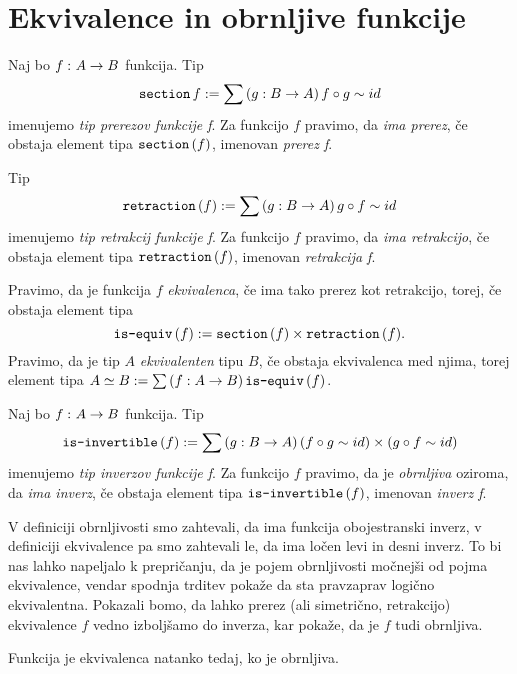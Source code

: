 \section{Ekvivalence in obrnljive funkcije}

\begin{definicija}
  Naj bo \(f \,\colon A \to B\) funkcija. Tip
  \[\textnormal{\texttt{section}}\, f := \sum \left( g : B \to A \right) f \circ g \sim id\]
  imenujemo \emph{tip prerezov funkcije f}. Za funkcijo \(f\) pravimo, da
  \emph{ima prerez}, če obstaja element tipa \(\textnormal{\texttt{section}}\,(f)\), imenovan \emph{prerez f}.

  Tip \[\textnormal{\texttt{retraction}}\,(f) := \sum \left( g : B \to A \right) g \circ f \sim id\] imenujemo
  \emph{tip retrakcij funkcije f}. Za funkcijo \(f\) pravimo, da \emph{ima retrakcijo}, če
  obstaja element tipa \(\textnormal{\texttt{retraction}}\,(f)\), imenovan \emph{retrakcija f}.
\end{definicija}

\begin{definicija}
  Pravimo, da je funkcija \(f\) \emph{ekvivalenca}, če ima tako prerez kot retrakcijo,
  torej, če obstaja element tipa \[\textnormal{\texttt{is-equiv}}\,(f) := \textnormal{\texttt{section}}\,(f) \times \textnormal{\texttt{retraction}}\,(f).\]
  Pravimo, da je tip \(A\) \emph{ekvivalenten} tipu \(B\), če obstaja ekvivalenca med
  njima, torej element tipa \(A \simeq B := \sum \left( f : A \to B \right) \textnormal{\texttt{is-equiv}}\,(f)\).
\end{definicija}

\begin{definicija}
  Naj bo \(f \,\colon A \to B\) funkcija. Tip
  \[\textnormal{\texttt{is-invertible}}\,(f) := \sum \left( g : B \to A \right) (f \circ g \sim id) \times (g \circ f \sim id)\]
  imenujemo \emph{tip inverzov funkcije f}. Za funkcijo \(f\) pravimo, da je
  \emph{obrnljiva} oziroma, da \emph{ima inverz}, če obstaja element tipa
  \(\textnormal{\texttt{is-invertible}}\,(f)\), imenovan \emph{inverz f}.
\end{definicija}

V definiciji obrnljivosti smo zahtevali, da ima funkcija obojestranski inverz, v
definiciji ekvivalence pa smo zahtevali le, da ima ločen levi in desni inverz.
To bi nas lahko
napeljalo k prepričanju, da je pojem obrnljivosti močnejši od pojma ekvivalence, vendar
spodnja trditev pokaže da sta pravzaprav logično ekvivalentna. Pokazali bomo, da lahko
prerez (ali simetrično, retrakcijo) ekvivalence \(f\) vedno izboljšamo do inverza,
kar pokaže, da je \(f\) tudi obrnljiva.

\begin{trditev}
  Funkcija je ekvivalenca natanko tedaj, ko je obrnljiva.
\end{trditev}

